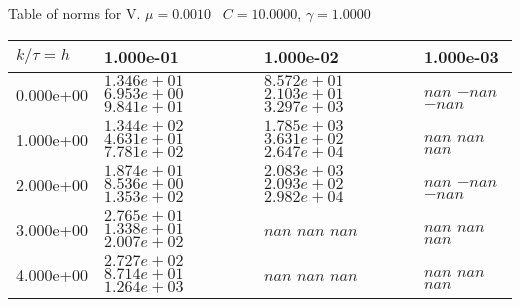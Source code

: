 \begin{center}
Table of norms for V. $\mu = 0.0010$ \, $C = 10.0000$, $\gamma = 1.0000$
  
\begin{tabular}{|p{1in}|p{1in}|p{1in}|p{1in}|} \hline
$k / \tau = h$ &1.000e-01 &1.000e-02 &1.000e-03 \\ \hline 
0.000e+00 & $1.346e+01$  $6.953e+00$  $9.841e+01$  & $8.572e+01$  $2.103e+01$  $3.297e+03$  & $nan$  $-nan$  $-nan$  \\ \hline 
1.000e+00 & $1.344e+02$  $4.631e+01$  $7.781e+02$  & $1.785e+03$  $3.631e+02$  $2.647e+04$  & $nan$  $nan$  $nan$  \\ \hline 
2.000e+00 & $1.874e+01$  $8.536e+00$  $1.353e+02$  & $2.083e+03$  $2.093e+02$  $2.982e+04$  & $nan$  $-nan$  $-nan$  \\ \hline 
3.000e+00 & $2.765e+01$  $1.338e+01$  $2.007e+02$  & $nan$  $nan$  $nan$  & $nan$  $nan$  $nan$  \\ \hline 
4.000e+00 & $2.727e+02$  $8.714e+01$  $1.264e+03$  & $nan$  $nan$  $nan$  & $nan$  $nan$  $nan$  \\ \hline 

\end{tabular}\\[20pt]
\end{center}
